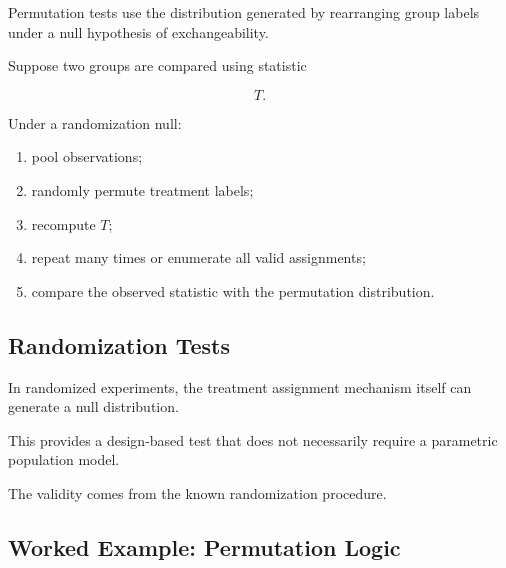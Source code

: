 Permutation tests use the distribution generated by rearranging group
labels under a null hypothesis of exchangeability.

Suppose two groups are compared using statistic

\[
T.
\]

Under a randomization null:

\begin{enumerate}
    \item pool observations;
    \item randomly permute treatment labels;
    \item recompute \(T\);
    \item repeat many times or enumerate all valid assignments;
    \item compare the observed statistic with the permutation
          distribution.
\end{enumerate}

\subsection{Randomization Tests}
\label{subsec:randomization-tests}

In randomized experiments, the treatment assignment mechanism itself can
generate a null distribution.

This provides a design-based test that does not necessarily require a
parametric population model.

The validity comes from the known randomization procedure.

\subsection{Worked Example: Permutation Logic}
\label{subsec:worked-permutation-logic}

